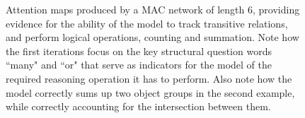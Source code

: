 \documentclass[fleqn]{article}
\begin{document}
\begin{figure}[t]
\begin{minipage}{0.79\textwidth}
\end{minipage}

\caption{Attention maps produced by a MAC network of length 6, providing evidence for the ability of the model to track transitive relations, and perform logical operations, counting and summation. Note how the first iterations focus on the key structural question words ``many" and ``or" that serve as indicators for the model of the required reasoning operation it has to perform. Also note how the model correctly sums up two object groups in the second example, while correctly accounting for the intersection between them.}
\label{vizz2}
\end{figure}
 
\end{document}
